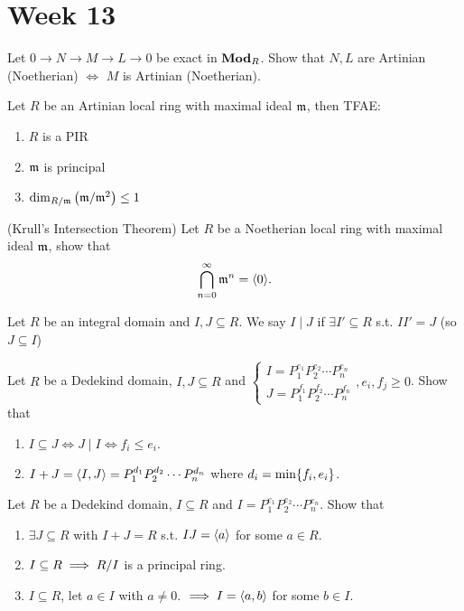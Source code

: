 
\section{Week 13}

\begin{exercise}
  Let $0 \to N \to M \to L \to 0$ be exact in $\mathbf{Mod}_R$.
  Show that $N, L$ are Artinian (Noetherian) $\iff$ $M$ is Artinian (Noetherian).
\end{exercise}

\begin{exercise}
  Let $R$ be an Artinian local ring with maximal ideal $\mathfrak{m}$, 
  then TFAE:
  \begin{enumerate}
    \item $R$ is a PIR
    \item $\mathfrak{m}$ is principal
    \item $\dim_{R/\mathfrak{m}} \left( \mathfrak{m}/\mathfrak{m}^2 \right) \leq 1$
  \end{enumerate}
\end{exercise}

\begin{exercise}{(Krull's Intersection Theorem)}
  Let $R$ be a Noetherian local ring with maximal ideal $\mathfrak{m}$, show that
  \[ \bigcap\limits_{n=0}^{\infty} \mathfrak{m}^n = \langle0\rangle. \]
\end{exercise}

\begin{definition}
  Let $R$ be an integral domain and $I, J \subseteq R$.
  We say $I \mid J$ if $\exists I' \subseteq R$ s.t. $II' = J$ (so $J \subseteq I$)
\end{definition}

\begin{exercise}
  Let $R$ be a Dedekind domain, $I, J \subseteq R$ and
  $\begin{cases}
    I = P_1^{e_1}P_2^{e_2} \dotsm P_n^{e_n} \\
    J = P_1^{f_1}P_2^{f_2} \dotsm P_n^{f_n}
  \end{cases}, e_i, f_j \ge 0$.
  Show that
  \begin{enumerate}
    \item $I \subseteq J \iff J \mid I \iff f_i \le e_i$.
    \item $I + J = \langle I, J\rangle = P_1^{d_1}P_2^{d_2} \dotsm P_n^{d_n}$ where
      $d_i = \min\lbrace f_i, e_i\rbrace$.
  \end{enumerate}
\end{exercise}

\begin{exercise}
  Let $R$ be a Dedekind domain, $I \subseteq R$ and $I = P_1^{e_1}P_2^{e_2} \dotsm P_n^{e_n}$.
  Show that
  \begin{enumerate}
    \item $\exists J \subseteq R$ with $I+J = R$ s.t. $IJ=\langle a\rangle$ for some
      $a \in R$.
    \item $I \subseteq R \implies {R}/{I}$ is a principal ring.
    \item $I \subseteq R$, let $a \in I$ with $a \ne 0$. $\implies I = \langle a, b\rangle$
      for some $b\in I$.
  \end{enumerate}
\end{exercise}
